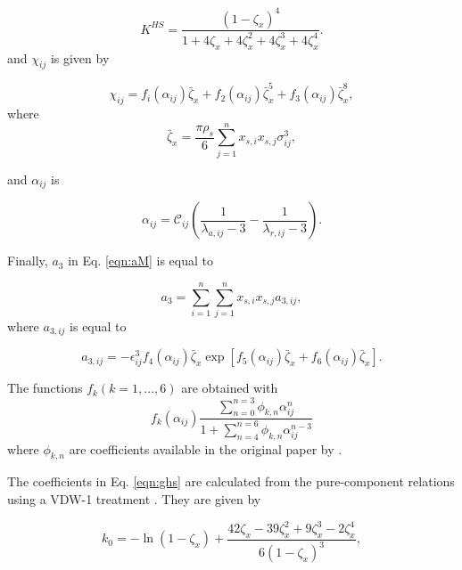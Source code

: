 \begin{equation}
K^{HS} = \dfrac{(1-\zeta_{x})^{4}}{1+4 \zeta_{x}+4 \zeta_{x}^{2}+4 \zeta_{x}^{3}+4 \zeta_{x}^{4}}.
\end{equation}
and $\chi_{ij}$ is given by

\begin{equation}
\chi_{ij} = f_{i}(\alpha_{ij}) \bar{\zeta}_{x} + f_{2}(\alpha_{ij}) \bar{\zeta}_{x}^{5} + f_{3}(\alpha_{ij}) \bar{\zeta}_{x}^{8},
\end{equation}
where
\begin{equation}
\bar{\zeta}_{x} = \frac{\pi \rho _{s}}{6} \sum_{j=1}^{n} x_{s,i} x_{s,j} \sigma_{ij}^{3},
\end{equation}

and $\alpha_{ij}$ is

\begin{equation}
\alpha_{ij} = \mathcal{C}_{ij} \left(\frac{1}{\lambda_{a,ij}-3} - \frac{1}{\lambda_{r,ij}-3} \right).
\end{equation}

Finally, $a_{3}$  in Eq. \ref{eqn:aM} is equal to

\begin{equation}
a_{3} = \sum_{i=1}^{n} \sum_{j=1}^{n} x_{s,i} x_{s,j} a_{3,ij},
\end{equation}	
where $a_{3,ij}$ is equal to

\begin{equation}
a_{3,ij} = - \epsilon _{ij}^{3} f_{4}(\alpha_{ij}) \bar{\zeta}_{x} \exp[f_{5}(\alpha_{ij}) \bar{\zeta}_{x}+ f_{6}(\alpha_{ij}) \bar{\zeta}_{x}].
\end{equation}

The functions $f_{k}(k=1,...,6)$ are obtained with
\begin{equation}
f_{k}(\alpha_{ij}) \dfrac{\sum_{n=0}^{n=3} \phi_{k,n} \alpha_{ij}^{n}}{1+ \sum_{n=4}^{n=6} \phi_{k,n} \alpha_{ij}^{n-3}}
\end{equation}
where $\phi_{k,n}$ are coefficients available in the original paper by .

The coefficients in Eq. \ref{eqn:ghs} are calculated from the pure-component relations using a VDW-1 treatment \cite{lafitte2013}. They are given by

\begin{equation}
k_{0} = - \ln(1-{\zeta}_{x}) + \frac{42{\zeta}_{x} -39{\zeta}_{x}^{2}+ 9{\zeta}_{x}^{3}-2{\zeta}_{x}^{4}}{6(1-\zeta_{x})^{3}},
\end{equation}

